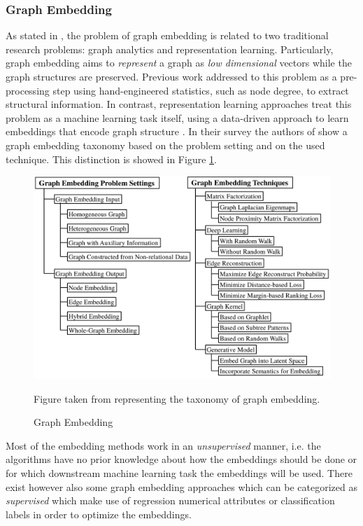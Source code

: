 \subsubsection{Graph Embedding}
As stated in \cite{surveyGraphEmbedding}, the problem of graph embedding is related to two traditional research problems: graph analytics and representation learning. Particularly, graph embedding aims to \textit{represent} a graph as \textit{low dimensional} vectors while the graph structures are preserved. Previous work addressed to this problem as a pre-processing step using hand-engineered statistics, such as node degree, to extract structural information. In contrast, representation learning approaches treat this problem as a machine learning task itself, using a data-driven approach to learn embeddings that encode graph structure \cite{representationLearning}.
In their survey the authors of \cite{surveyGraphEmbedding} show a graph embedding taxonomy based on the problem setting and on the used technique. This distinction is showed in Figure \ref{fig:taxonomy_graph_embedding}. 
\begin{figure}
\centering
\includegraphics[width=14cm]{pictures/taxonomy.png}
\caption{Graph Embedding}
Figure taken from \cite{surveyGraphEmbedding} representing the taxonomy of graph embedding.
\label{fig:taxonomy_graph_embedding}
\end{figure}

Most of the embedding methods work in an \textit{unsupervised} manner, i.e. the algorithms have no prior knowledge about how the embeddings should be done or for which downstream machine learning task the embeddings will be used. There exist however also some graph embedding approaches which can be categorized as \textit{supervised} which make use of regression numerical attributes or classification labels in order to optimize the embeddings. 

